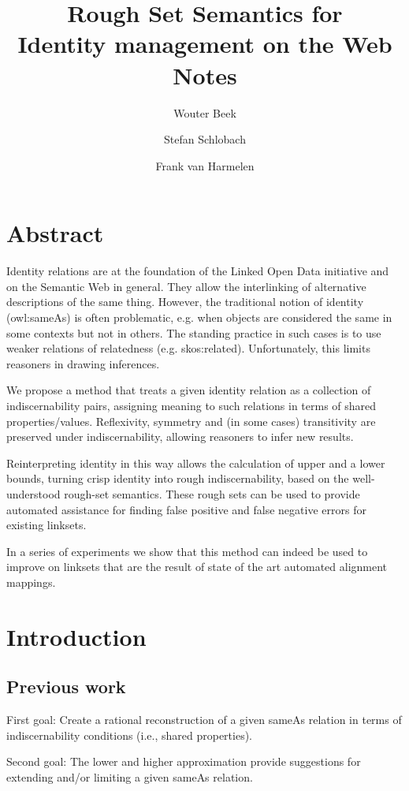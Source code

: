 \documentclass[11pt,a4paper,notitlepage,onecolumn,twoside]{article}
\title{Rough Set Semantics for\\Identity management on the Web\\Notes}
\author{Wouter Beek \and Stefan Schlobach \and Frank van Harmelen}
\begin{document}
\maketitle

\section{Abstract}

Identity relations are at the foundation of the Linked Open Data initiative and on the Semantic Web in general. They allow the interlinking of alternative descriptions of the same thing. However, the traditional notion of identity (owl:sameAs) is often problematic, e.g. when objects are considered the same in some contexts but not in others. The standing practice in such cases is to use weaker relations of relatedness (e.g. skos:related). Unfortunately, this limits reasoners in drawing inferences. 

We propose a method that treats a given identity relation as a collection of indiscernability pairs, assigning meaning to such relations in terms of shared properties/values. Reflexivity, symmetry and (in some cases) transitivity are preserved under indiscernability, allowing reasoners to infer new results.

Reinterpreting identity in this way allows the calculation of upper and a lower bounds, turning crisp identity into rough indiscernability, based on the well-understood rough-set semantics. These rough sets can be used to provide automated assistance for finding false positive and false negative errors for existing linksets.

In a series of experiments we show that this method can indeed be used to improve on linksets that are the result of state of the art automated alignment mappings.

\section{Introduction}

\subsection{Previous work}

First goal: Create a rational reconstruction of a given sameAs relation in terms of indiscernability conditions (i.e., shared properties).

Second goal: The lower and higher approximation provide suggestions for extending and/or limiting a given sameAs relation.
\end{document}
